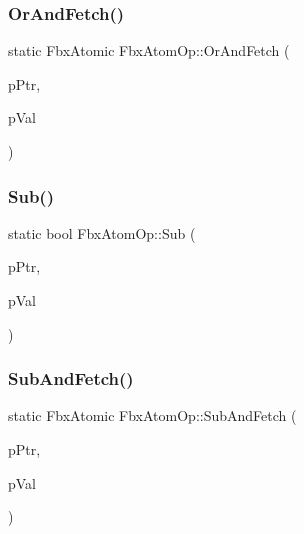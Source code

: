 \mbox{\label{class_fbx_atom_op_a14bbfad1f361b4154bad77c585d72481}} 
\subsubsection{\texorpdfstring{Or\+And\+Fetch()}{OrAndFetch()}}
{\footnotesize\ttfamily static Fbx\+Atomic Fbx\+Atom\+Op\+::\+Or\+And\+Fetch (\begin{DoxyParamCaption}\item[{volatile Fbx\+Atomic $\ast$}]{p\+Ptr,  }\item[{Fbx\+Atomic}]{p\+Val }\end{DoxyParamCaption})\hspace{0.3cm}{\ttfamily [static]}}

\mbox{\label{class_fbx_atom_op_a9b18f6c0282cd22995b64691a77718c1}} 
\subsubsection{\texorpdfstring{Sub()}{Sub()}}
{\footnotesize\ttfamily static bool Fbx\+Atom\+Op\+::\+Sub (\begin{DoxyParamCaption}\item[{volatile Fbx\+Atomic $\ast$}]{p\+Ptr,  }\item[{Fbx\+Atomic}]{p\+Val }\end{DoxyParamCaption})\hspace{0.3cm}{\ttfamily [static]}}

\mbox{\label{class_fbx_atom_op_a3e22bd134a890d48dc95d28744ca4e46}} 
\subsubsection{\texorpdfstring{Sub\+And\+Fetch()}{SubAndFetch()}}
{\footnotesize\ttfamily static Fbx\+Atomic Fbx\+Atom\+Op\+::\+Sub\+And\+Fetch (\begin{DoxyParamCaption}\item[{volatile Fbx\+Atomic $\ast$}]{p\+Ptr,  }\item[{Fbx\+Atomic}]{p\+Val }\end{DoxyParamCaption})\hspace{0.3cm}{\ttfamily [static]}}


